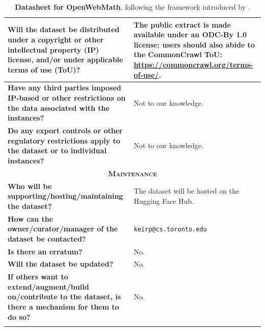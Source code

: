 \begin{longtable}{p{6cm}|p{6cm}}
    \textbf{Will the dataset be distributed under a copyright or other intellectual property (IP) license, and/or under applicable terms of use (ToU)?} & The public extract is made available under an ODC-By 1.0 license; users should also abide to the CommonCrawl ToU: \href{https://commoncrawl.org/terms-of-use/}{https://commoncrawl.org/terms-of-use/}. \\ \midrule
    \textbf{Have any third parties imposed IP-based or other restrictions on the data associated with the instances?} & Not to our knowledge. \\ \midrule
    \textbf{Do any export controls or other regulatory restrictions apply to the dataset or to individual instances?} & Not to our knowledge. \\ \midrule
    \multicolumn{2}{c}{\textsc{\textbf{Maintenance}}} \\ \midrule
    \textbf{Who will be supporting/hosting/maintaining the dataset?} & The dataset will be hosted on the Hugging Face Hub. \\ \midrule
    \textbf{How can the owner/curator/manager of the dataset be contacted?} & \texttt{keirp@cs.toronto.edu} \\ \midrule
    \textbf{Is there an erratum?} & No. \\ \midrule
    \textbf{Will the dataset be updated?} & No. \\ \midrule
    \textbf{If others want to extend/augment/build on/contribute to the dataset, is there a mechanism for them to do so?} & No. \\ \bottomrule
    \caption{\textbf{Datasheet for OpenWebMath}, following the framework introduced by \citet{gebru2021datasheets}.}
    \label{tab:datasheet}
\end{longtable}
\clearpage
